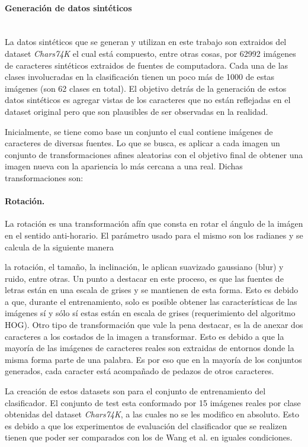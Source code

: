		\paragraph{Generación de datos sintéticos} ~\\

			La datos sintéticos que se generan y utilizan en este trabajo son extraidos del dataset \textit{Chars74K} el cual está compuesto, entre otras cosas, por 62992 imágenes de caracteres sintéticos extraidos de fuentes de computadora. Cada una de las clases involucradas en la clasificación tienen un poco más de 1000 de estas imágenes (son 62 clases en total). El objetivo detrás de la generación de estos datos sintéticos es agregar vistas de los caracteres que no están reflejadas en el dataset original pero que son plausibles de ser observadas en la realidad.
			
			Inicialmente, se tiene como base un conjunto el cual contiene imágenes de caracteres de diversas fuentes. Lo que se busca, es aplicar a cada imagen un conjunto de transformaciones afines aleatorias con el objetivo final de obtener una imagen nueva con la apariencia  lo más cercana a una real. Dichas transformaciones son:
			
			\paragraph{Rotación.}
			
				La rotación es una transformación afín que consta en rotar el ángulo de la imágen en el sentido anti-horario. El parámetro usado para el mismo son los radianes y se calcula de la siguiente manera
			
			la rotación, el tamaño, la inclinación, le aplican suavizado gaussiano (blur) y ruido, entre otras. Un punto a destacar en este proceso, es que las fuentes de letras están en una escala de grises y se mantienen de esta forma. Esto es debido a que, durante el entrenamiento, solo es posible obtener las características de las imágenes sí y sólo sí estas están en escala de grises (requerimiento del algoritmo HOG). Otro tipo de transformación que vale la pena destacar, es la de anexar dos caracteres a los costados de la imagen a transformar. Esto es debido a que la mayoría de las imágenes de caracteres reales son extraidas de entornos donde la misma forma parte de una palabra. Es por eso que en la mayoría de los conjuntos generados, cada caracter está acompañado de pedazos de otros caracteres.

			La creación de estos datasets son para el conjunto de entrenamiento del clasificador. El conjunto de test esta conformado por 15 imágenes reales por clase obtenidas del dataset \textit{Chars74K}, a las cuales no se les modifico en absoluto. Esto es debido a que los experimentos de evaluación del clasificador que se realizen tienen que poder ser comparados con los de Wang et al. en iguales condiciones.


